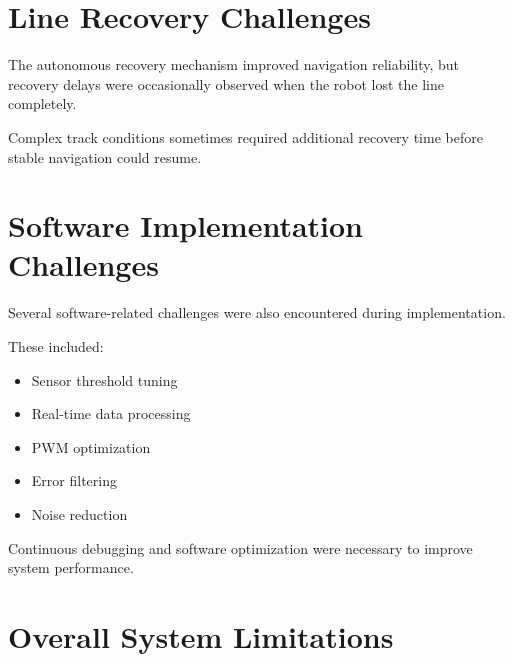 \documentclass[12pt,a4paper,oneside]{report}
\begin{document}

\section{Line Recovery Challenges}

The autonomous recovery mechanism improved navigation reliability, but recovery delays were occasionally observed when the robot lost the line completely.

Complex track conditions sometimes required additional recovery time before stable navigation could resume.


\section{Software Implementation Challenges}

Several software-related challenges were also encountered during implementation.

These included:

\begin{itemize}

\item Sensor threshold tuning

\item Real-time data processing

\item PWM optimization

\item Error filtering

\item Noise reduction

\end{itemize}

Continuous debugging and software optimization were necessary to improve system performance.


\section{Overall System Limitations}
\end{document}
